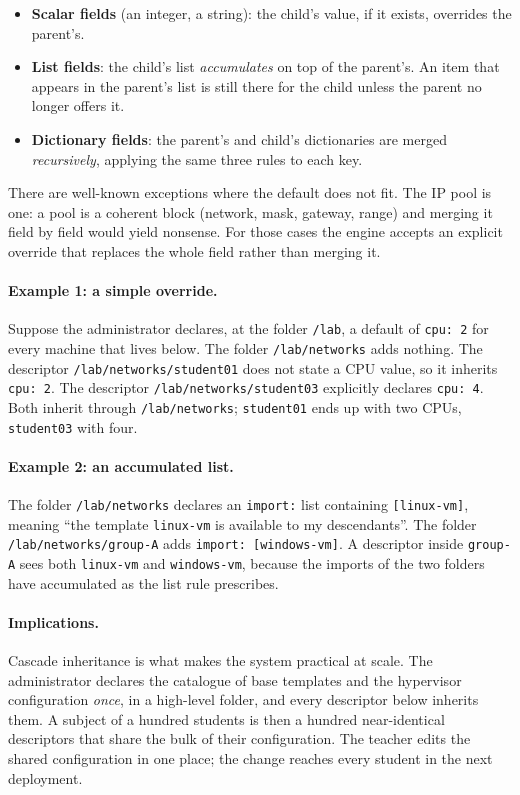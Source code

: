 \begin{itemize}
  \item \textbf{Scalar fields} (an integer, a string): the child's
        value, if it exists, overrides the parent's.
  \item \textbf{List fields}: the child's list \emph{accumulates}
        on top of the parent's. An item that appears in the
        parent's list is still there for the child unless the parent
        no longer offers it.
  \item \textbf{Dictionary fields}: the parent's and child's
        dictionaries are merged \emph{recursively}, applying the
        same three rules to each key.
\end{itemize}

There are well-known exceptions where the default does not fit. The
IP pool is one: a pool is a coherent block (network, mask, gateway,
range) and merging it field by field would yield nonsense. For
those cases the engine accepts an explicit override that replaces
the whole field rather than merging it.

\paragraph{Example 1: a simple override.}
Suppose the administrator declares, at the folder \texttt{/lab}, a
default of \texttt{cpu: 2} for every machine that lives below. The
folder \texttt{/lab/networks} adds nothing. The descriptor
\texttt{/lab/networks/student01} does not state a CPU value, so it
inherits \texttt{cpu: 2}. The descriptor
\texttt{/lab/networks/student03} explicitly declares \texttt{cpu: 4}.
Both inherit through \texttt{/lab/networks}; \texttt{student01} ends
up with two CPUs, \texttt{student03} with four.

\paragraph{Example 2: an accumulated list.}
The folder \texttt{/lab/networks} declares an \texttt{import:} list
containing \texttt{[linux-vm]}, meaning ``the template
\texttt{linux-vm} is available to my descendants''. The folder
\texttt{/lab/networks/group-A} adds \texttt{import: [windows-vm]}.
A descriptor inside \texttt{group-A} sees both \texttt{linux-vm} and
\texttt{windows-vm}, because the imports of the two folders have
accumulated as the list rule prescribes.

\paragraph{Implications.}
Cascade inheritance is what makes the system practical at scale.
The administrator declares the catalogue of base templates and the
hypervisor configuration \emph{once}, in a high-level folder, and
every descriptor below inherits them. A subject of a hundred
students is then a hundred near-identical descriptors that share
the bulk of their configuration. The teacher edits the shared
configuration in one place; the change reaches every student in the
next deployment.

